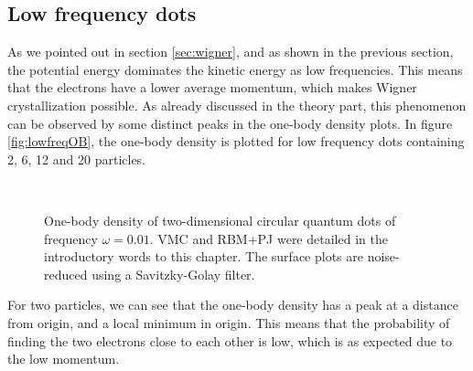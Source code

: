 \newpage
\subsection{Low frequency dots} \label{sec:lowfrequencies}
As we pointed out in section \ref{sec:wigner}, and as shown in the previous section, the potential energy dominates the kinetic energy as low frequencies. This means that the electrons have a lower average momentum, which makes Wigner crystallization possible. As already discussed in the theory part, this phenomenon can be observed by some distinct peaks in the one-body density plots. In figure \eqref{fig:lowfreqOB}, the one-body density is plotted for low frequency dots containing 2, 6, 12 and 20 particles. 

\begin{figure}[H]
	\centering
	\captionsetup[subfigure]{labelformat=empty}
	\hspace{0.1cm}
	\hspace{-0.5cm}
	\hspace{-0.5cm}
	\\ [-0.5cm]
	
	\hspace{0.1cm}
	\hspace{-0.5cm}
	\hspace{-0.5cm}
	
	\caption{One-body density of two-dimensional circular quantum dots of frequency $\omega=0.01$. VMC and RBM+PJ were detailed in the introductory words to this chapter. The surface plots are noise-reduced using a Savitzky-Golay filter.}
	\label{fig:lowfreqOB}
\end{figure}

For two particles, we can see that the one-body density has a peak at a distance from origin, and a local minimum in origin. This means that the probability of finding the two electrons close to each other is low, which is as expected due to the low momentum. 


